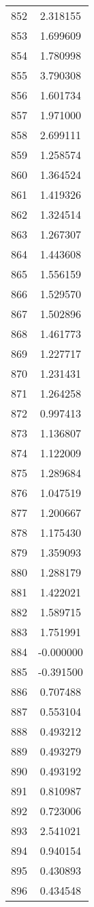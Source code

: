 \documentclass[12pt]{article}
\begin{document}
\begin{longtable}{@{}cc@{}}
852 & 2.318155 \\
853 & 1.699609 \\
854 & 1.780998 \\
855 & 3.790308 \\
856 & 1.601734 \\
857 & 1.971000 \\
858 & 2.699111 \\
859 & 1.258574 \\
860 & 1.364524 \\
861 & 1.419326 \\
862 & 1.324514 \\
863 & 1.267307 \\
864 & 1.443608 \\
865 & 1.556159 \\
866 & 1.529570 \\
867 & 1.502896 \\
868 & 1.461773 \\
869 & 1.227717 \\
870 & 1.231431 \\
871 & 1.264258 \\
872 & 0.997413 \\
873 & 1.136807 \\
874 & 1.122009 \\
875 & 1.289684 \\
876 & 1.047519 \\
877 & 1.200667 \\
878 & 1.175430 \\
879 & 1.359093 \\
880 & 1.288179 \\
881 & 1.422021 \\
882 & 1.589715 \\
883 & 1.751991 \\
884 & -0.000000 \\
885 & -0.391500 \\
886 & 0.707488 \\
887 & 0.553104 \\
888 & 0.493212 \\
889 & 0.493279 \\
890 & 0.493192 \\
891 & 0.810987 \\
892 & 0.723006 \\
893 & 2.541021 \\
894 & 0.940154 \\
895 & 0.430893 \\
896 & 0.434548 \\

\end{longtable}
\end{document}
